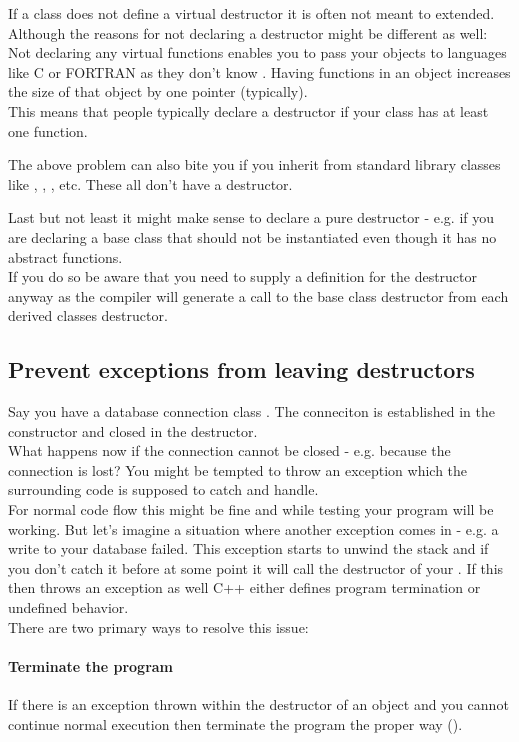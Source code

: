 \documentclass[a4paper, twocolumn]{article}
\let\oldsubsection\subsection
\newcounter{mysubsection}
\renewcommand{\subsection}{
    \stepcounter{mysubsection}
    \oldsubsection
}
\newcommand{\code}[1]{\texttt{\color{black}{#1}}}
\begin{document}
If a class does not define a virtual destructor it is often not meant to extended. Although the reasons for not declaring a \code{virtual} destructor might be different as well:\\
Not declaring any virtual functions enables you to pass your objects to languages like C or FORTRAN as they don't know \code{virtual}. Having \code{virtual} functions in an object increases the size of that object by one pointer (typically).\\
This means that people typically declare a \code{virtual} destructor if your class has at least one \code{virtual} function.

The above problem can also bite you if you inherit from standard library classes like \code{string}, \code{vector}, \code{map}, etc. These all don't have a \code{virtual} destructor.

Last but not least it might make sense to declare a pure \code{virtual} destructor - e.g. if you are declaring a base class that should not be instantiated even though it has no abstract functions.\\
If you do so be aware that you need to supply a definition for the destructor anyway as the compiler will generate a call to the base class destructor from each derived classes destructor.

\subsection{Prevent exceptions from leaving destructors}
Say you have a database connection class \code{DbConnection}. The conneciton is established in the constructor and closed in the destructor.\\
What happens now if the connection cannot be closed - e.g. because the connection is lost? You might be tempted to throw an exception which the surrounding code is supposed to catch and handle.\\
For normal code flow this might be fine and while testing your program will be working. But let's imagine a situation where another exception comes in - e.g. a write to your database failed.
This exception starts to unwind the stack and if you don't catch it before at some point it will call the destructor of your \code{DbConnection}. If this then throws an exception as well C++ either defines program termination or undefined behavior.\\

There are two primary ways to resolve this issue:
\paragraph{Terminate the program}
If there is an exception thrown within the destructor of an object and you cannot continue normal execution then terminate the program the proper way (\code{std::abort();}).
\end{document}
